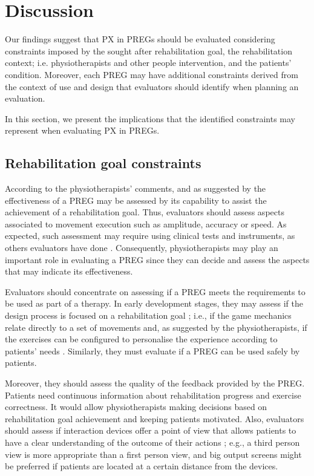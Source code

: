 \section{Discussion}\label{sec:discussion_char} %
Our findings suggest that \ac{PX} in \acp{PREG} should be evaluated considering constraints imposed by the sought after rehabilitation goal, the rehabilitation context; i.e. physiotherapists and other people intervention, and the patients' condition. Moreover, each \ac{PREG} may have additional constraints derived from the context of use and design that evaluators should identify when planning an evaluation.

In this section, we present the implications that the identified constraints may represent when evaluating \ac{PX} in \acp{PREG}.

\subsection{Rehabilitation goal constraints}
According to the physiotherapists' comments, and as suggested by \textcite{PirovanoAdvisor2012} the effectiveness of a \ac{PREG} may be assessed by its capability to assist the achievement of a rehabilitation goal. Thus, evaluators should assess aspects associated to movement execution such as amplitude, accuracy or speed. As expected, such assessment may require using clinical tests and instruments, as others evaluators have done \autocite{Brokaw2015,Burke2009,Cameirao2010,jansen2013serious,Ni2014,Seo2016,Wuest2014}. Consequently, physiotherapists may play an important role in evaluating a \ac{PREG} since they can decide and assess the aspects that may indicate its effectiveness.

Evaluators should concentrate on assessing if a \ac{PREG} meets the requirements to be used as part of a therapy. In early development stages, they may assess if the design process is focused on a rehabilitation goal \autocite{PirovanoAdvisor2012,Wiemeyer2015}; i.e., if the game mechanics relate directly to a set of movements and, as suggested by the physiotherapists, if the exercises can be configured to personalise the experience according to patients' needs \autocite{Ni2014,Nijholt2008,Wiemeyer2015}. Similarly, they must evaluate if a \ac{PREG} can be used safely by patients.

Moreover, they should assess the quality of the feedback provided by the \ac{PREG}. Patients need continuous information about rehabilitation progress and exercise correctness. It would allow physiotherapists making decisions based on rehabilitation goal achievement and keeping patients motivated. Also, evaluators should assess if interaction devices offer a point of view that allows patients to have a clear understanding of the outcome of  their actions \autocite{PirovanoAdvisor2012}; e.g., a third person view is more appropriate than a first person view, and big output screens might be preferred if patients are located at a certain distance from the devices.


